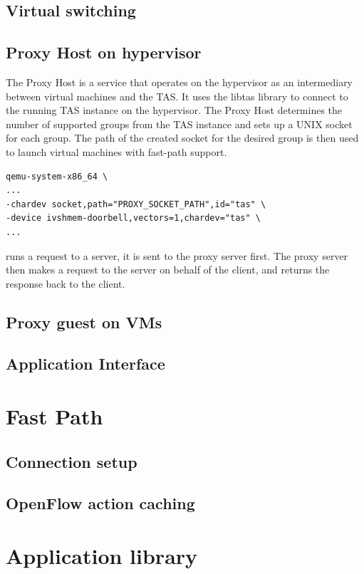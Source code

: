 \subsection{Virtual switching}
\subsection{Proxy Host on hypervisor}

The Proxy Host is a service that operates on the hypervisor as an intermediary between virtual 
machines and the TAS. It uses the libtas library to connect to the running TAS instance on 
the hypervisor. The Proxy Host determines the number of supported groups from the TAS instance 
and sets up a UNIX socket for each group. The path of the created socket for the desired group 
is then used to launch virtual machines with fast-path support.
\begin{lstlisting}[caption={QEMU system x86-64 command with ivshmem-doorbell and socket interface for connection to proxy host},captionpos=b]
qemu-system-x86_64 \
...
-chardev socket,path="PROXY_SOCKET_PATH",id="tas" \
-device ivshmem-doorbell,vectors=1,chardev="tas" \ 
...
\end{lstlisting}

runs a request to a server, it is sent to the proxy server first. The proxy server then makes a request to the server on behalf of the client, and returns the response back to the client.
\subsection{Proxy guest on VMs}
\subsection{Application Interface}

\section{Fast Path}
\subsection{Connection setup}
\subsection{OpenFlow action caching}

\section{Application library}